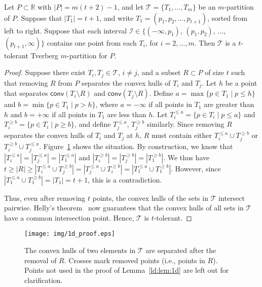 \documentclass[oribibl,envcountsame,envcountsect]{llncs}
\newcommand{\mc}[1]{\ensuremath{\mathcal{#1}}}
\newcommand{\conv}{\mathsf{conv}}
\newcommand{\real}{\mathbb{R}}
\begin{document}
\begin{lemma}
  \label{ld:lem:1d}
  Let $P\subset \real$ with $|P| = m(t+2)-1$, and let
  $\mc{T}=\{T_1,\ldots,T_m\}$ be an $m$-partition of $P$.
  Suppose that $|T_1| = t+1$, and write $T_1 = (p_1, p_2, \dots, p_{t+1})$, sorted
  from left to right. Suppose that each interval $\mc{I}\in \{(-\infty, p_{1})$,
  $(p_{1},p_{2})$, $\ldots$,$(p_{t+1},\infty)\}$ contains one point
  from each $T_i$, for $i = 2, \dots, m$. Then $\mc{T}$
  is a $t$-tolerant Tverberg $m$-partition for $P$.
\end{lemma}
\begin{proof}
  Suppose there exist $T_i, T_j \in \mc{T}$, $i \neq j$, and a subset $R\subset
  P$ of size $t$ such that removing $R$  from $P$ separates the convex hulls of
  $T_i$ and $T_j$.  Let $h$ be a point that separates $\conv(T_i \setminus R)$
  and $\conv(T_j \setminus R)$.  Define $a = \max\{p \in T_1 \mid p\leq h\}$ and
  $b= \min\{p \in T_1 \mid p > h\}$, where $a = -\infty$ if all points in $T_1$
  are greater than $h$ and $b=+\infty$ if all points in $T_1$ are less than $h$.
  Let $T_i^{\leq a} = \{ p \in T_i \mid p \leq a\}$ and $T_i^{\geq b} = \{p \in
  T_i \mid p \geq  b\}$, and define $T_j^{\leq a}$, $T_j^{\geq b}$ similarly.
  Since removing $R$ separates the convex hulls of $T_i$ and $T_j$ at $h$, $R$
  must contain either $T_i^{\leq a} \cup T_j^{\geq b}$ or $T_i^{\geq b} \cup
  T_j^{\leq a}$. Figure~\ref{ld:fig:lem1dproof} shows the situation. By
  construction, we know that $|T^{\leq a}_i| = |T^{\leq a}_j|
  = |T^{\leq a}_1|$ and $|T^{\geq b}_i| = |T^{\geq b}_j| = |T^{\geq b}_1|$. We
  thus have $t \geq |R| \geq |T_i^{\leq a} \cup T_j^{\geq b}| = |T_j^{\leq a}
  \cup T_i^{\geq b}| = |T_1^{\leq a} \cup T_1^{\geq b}|$. However, since
  $|T_1^{\leq a} \cup T^{\geq b}_1| = |T_1| = t+1$, this is a contradiction.

  Thus, even after removing $t$ points, the convex hulls of the sets in $\mc{T}$
  intersect pairwise. Helly's theorem~\cite{Matouvsek2002} now
  guarantees that the convex hulls of all sets in $\mc{T}$ have a common
  intersection point. Hence, $\mc{T}$ is $t$-tolerant.
\end{proof}

\begin{figure}[htbp]
  \begin{center}
    \texttt{[image: img/1d\_proof.eps]}
  \end{center}
  \caption{The convex hulls of two elements in \mc{T} are separated after the
    removal of $R$. Crosses mark removed points (i.e., points in $R$).
    Points not used in the proof of Lemma~\ref{ld:lem:1d} are left out for
    clarification.}
  \label{ld:fig:lem1dproof}
\end{figure}
\end{document}
